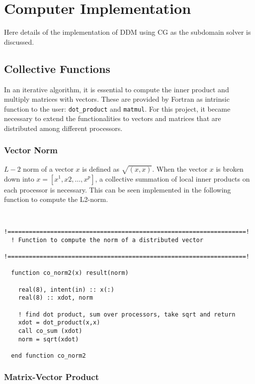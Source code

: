 \documentclass[12pt]{report}
\begin{document}
\section{Computer Implementation}

Here details of the implementation of DDM using CG as the
subdomain solver is discussed.

\subsection{Collective Functions}

In an iterative algorithm, it is essential to compute the inner
product and multiply matrices with vectors. These are provided by
Fortran as intrinsic function to the user: \texttt{dot\_product} and
\texttt{matmul}. For this project, it became necessary to extend the
functionalities to vectors and matrices that are distributed among
different processors. 

\subsubsection{Vector Norm}

$L-2$ norm of a vector $x$ is defined as $\sqrt{(x,x)}$. When the
vector $x$ is broken down into $x=[x^{1},x{2},\ldots,x^{p}]$, a
collective summation of local inner products on each processor is
necessary. This can be seen implemented in the following function to
compute the L2-norm.
  
\begin{verbatim}

  !===================================================================!
  ! Function to compute the norm of a distributed vector
  !===================================================================!
  
  function co_norm2(x) result(norm)

    real(8), intent(in) :: x(:)    
    real(8) :: xdot, norm

    ! find dot product, sum over processors, take sqrt and return
    xdot = dot_product(x,x)  
    call co_sum (xdot)
    norm = sqrt(xdot)

  end function co_norm2

\end{verbatim}

\subsubsection{Matrix-Vector Product}
\end{document}
